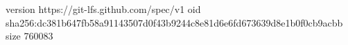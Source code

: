 version https://git-lfs.github.com/spec/v1
oid sha256:dc381b647fb58a91143507d0f43b9244c8e81d6e6fd673639d8e1b0f0cb9acbb
size 760083
